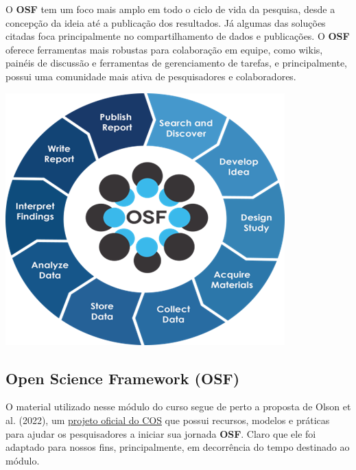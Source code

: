 \documentclass[
  a4paper,
]{article}
\begin{document}
O \textbf{OSF} tem um foco mais amplo em todo o ciclo de vida da
pesquisa, desde a concepção da ideia até a publicação dos resultados. Já
algumas das soluções citadas foca principalmente no compartilhamento de
dados e publicações. O \textbf{OSF} oferece ferramentas mais robustas
para colaboração em equipe, como wikis, painéis de discussão e
ferramentas de gerenciamento de tarefas, e principalmente, possui uma
comunidade mais ativa de pesquisadores e colaboradores.

\begin{center}
\includegraphics{img/osf-researchcycle.png}
\end{center}

\subsection{Open Science Framework
(OSF)}\label{open-science-framework-osf}

O material utilizado nesse módulo do curso segue de perto a proposta de
Olson et al. (2022), um \href{https://osf.io/yaqe8/}{projeto oficial do
COS} que possui recursos, modelos e práticas para ajudar os
pesquisadores a iniciar sua jornada \textbf{OSF}. Claro que ele foi
adaptado para nossos fins, principalmente, em decorrência do tempo
destinado ao módulo.
\end{document}

